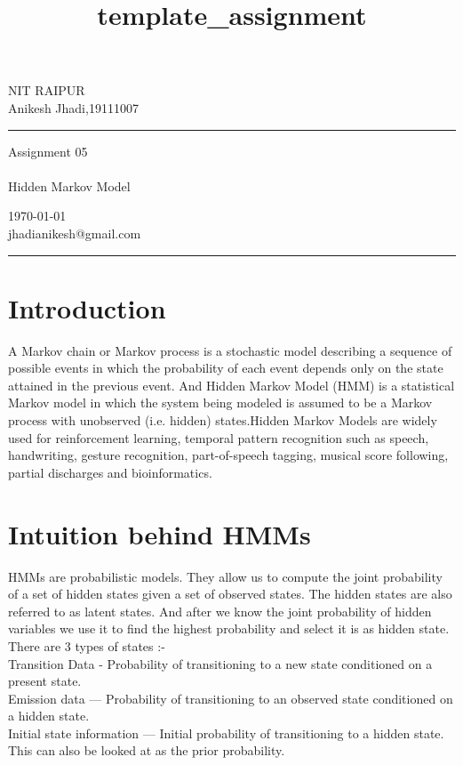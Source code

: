\documentclass[a4paper,10pt]{article}
\begin{document}
\title{template_assignment} 
\fancyhead[C]{}
\begin{minipage}{0.295\textwidth} 
\raggedright
NIT RAIPUR\\ 
\footnotesize 
Anikesh Jhadi,19111007 
\medskip\hrule
\end{minipage}
\begin{minipage}{0.4\textwidth} 
\centering 
\large 
Assignment 05\\ 
\normalsize\\ 
Hidden Markov Model\\
\end{minipage}
\begin{minipage}{0.295\textwidth} 
\raggedleft
\today\\ 
\footnotesize 
jhadianikesh@gmail.com
\medskip\hrule
\end{minipage}
\section{Introduction}
A Markov chain or Markov process is a stochastic model describing a sequence of possible events in which the probability of each event depends only on the state attained in the previous event. And Hidden Markov Model (HMM) is a statistical Markov model in which the system being modeled is assumed to be a Markov process with unobserved (i.e. hidden) states.Hidden Markov Models are widely used for reinforcement learning, temporal pattern recognition such as speech, handwriting, gesture recognition, part-of-speech tagging, musical score following, partial discharges and bioinformatics.

\section{Intuition behind HMMs}
HMMs are probabilistic models. They allow us to compute the joint probability of a set of hidden states given a set of observed states. The hidden states are also referred to as latent states. And after we know the joint probability of hidden variables we use it to find the highest probability and select it is as hidden state.
\\
There are 3 types of states :-
\\
Transition Data - Probability of transitioning to a new state conditioned on a present state.
\\
Emission data — Probability of transitioning to an observed state conditioned on a hidden state.
\\
Initial state information — Initial probability of transitioning to a hidden state. This can also be looked at as the prior probability. 
\end{document}
